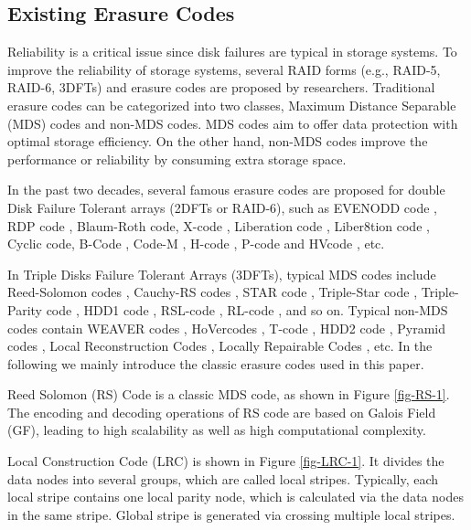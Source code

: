 \documentclass[sigconf]{acmart}
\begin{document}

\subsection{Existing Erasure Codes}\label{existEC}

Reliability is a critical issue since disk failures are typical in storage systems. To improve the reliability of storage systems, several RAID forms (e.g., RAID-5, RAID-6, 3DFTs) and erasure codes are proposed by researchers.  Traditional erasure codes can be categorized into two classes, Maximum Distance Separable (MDS) codes and non-MDS codes. MDS codes aim to offer data protection with optimal storage efficiency. On the other hand, non-MDS codes improve the performance or reliability by consuming extra storage space.

In the past two decades, several famous erasure codes are proposed for double Disk Failure Tolerant arrays (2DFTs or RAID-6), such as EVENODD code \cite{EVENODD}, RDP code \cite{RDP}, Blaum-Roth code\cite{BlaumRoth}, X-code \cite{XCode}, Liberation code \cite{Liberation}, Liber8tion code \cite{Liber8tion}, Cyclic \cite {Cyclic} code, B-Code \cite{BCode}, Code-M \cite{Code-M}, H-code \cite{hcode}, P-code \cite{PCode} and HVcode \cite{HVCode}, etc.

In Triple Disks Failure Tolerant Arrays (3DFTs), typical MDS codes include Reed-Solomon codes \cite{RS}, Cauchy-RS codes \cite{CRS}, STAR code \cite{STAR}, Triple-Star code \cite{TripleStar}, Triple-Parity code \cite{TPtech}, HDD1 code \cite{HDD}, RSL-code \cite{RSL}, RL-code \cite{RL}, and so on. Typical non-MDS codes contain WEAVER codes \cite{WEAVER}, HoVercodes \cite{HoVer}, T-code \cite{TCode}, HDD2 code \cite{HDD}, Pyramid codes \cite{Pyramid}, Local Reconstruction Codes \cite{LRC}, Locally Repairable Codes \cite{XORing}, etc.
In the following we mainly introduce the classic erasure codes used in this paper.

Reed Solomon (RS) Code \cite{RS} is a classic MDS code, as shown in Figure \ref{fig-RS-1}. The encoding and decoding operations of RS code are based on Galois Field (GF), leading to high scalability as well as high computational complexity.

Local Construction Code (LRC) \cite{LRC} 
is shown in Figure \ref{fig-LRC-1}. It divides the data nodes into several groups, which are called local stripes. Typically, each local stripe contains one local parity node, which is calculated via the data nodes in the same stripe. Global stripe is generated via crossing multiple local stripes.
\end{document}
